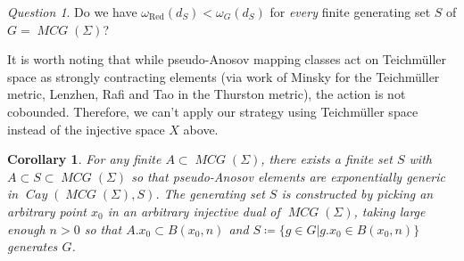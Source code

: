 \documentclass{amsart}
\numberwithin{thm}{section}
\numberwithin{figure}{section}
\newtheorem{cor}[thm]{Corollary}
\theoremstyle{definition}
\theoremstyle{definition}
\theoremstyle{remark}
\newtheorem{quest}[thm]{Question}
\numberwithin{equation}{section}
\DeclareMathOperator{\Cay}{\mathit{Cay}}
\DeclareMathOperator{\MCG}{\mathit{MCG}}
\theoremstyle{plain}
\begin{document}
\begin{quest} 
Do we have \( \omega_{\text{Red}}({d_S}) < \omega_G({d_S}) \) for \emph{every} finite generating set $S$ of $G=\MCG(\Sigma)$?
\end{quest}






































































It is worth noting that while pseudo-Anosov mapping classes act on Teichmüller space as strongly contracting elements (via work of Minsky \cite{Minsky1996} for the Teichmüller metric, Lenzhen, Rafi and Tao \cite{Lenzhen2011} in the Thurston metric), the action is not cobounded. Therefore, we can't apply our strategy using Teichmüller space instead of the injective space $X$ above. 


\begin{cor} For any finite $A \subset \MCG(\Sigma)$, there exists a finite set $S$ with $A \subset S \subset \MCG(\Sigma)$ so that pseudo-Anosov elements are exponentially generic in $\Cay(\MCG(\Sigma), S)$. The generating set $S$ is constructed by picking an arbitrary point $x_0$ in an arbitrary injective dual of $\MCG(\Sigma)$, taking large enough $n >0$ so that $A. x_0 \subset B(x_0,n)$ and $S \coloneqq \{ g \in G | g . x_0 \in B(x_0,n) \}$ generates $G$.
\end{cor}
\end{document}
